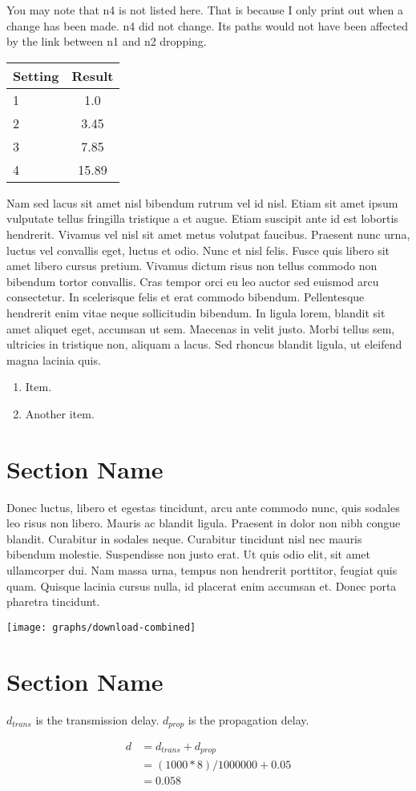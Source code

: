 \documentclass[fleqn,11pt]{article}
\begin{document}
You may note that n4 is not listed here. That is because I only print out when a change has been made. n4 did not change. Its paths would not have been affected by the link between n1 and n2 dropping.

\vspace{0.5cm}
\begin{tabular}{lc}
  \toprule
  Setting & Result\\
  \midrule
  1 & 1.0\\
  2 & 3.45\\
  3 & 7.85\\
  4 & 15.89\\
  \bottomrule
\end{tabular}
\vspace{0.5cm}

Nam sed lacus sit amet nisl bibendum rutrum vel id nisl. Etiam sit
amet ipsum vulputate tellus fringilla tristique a et augue. Etiam
suscipit ante id est lobortis hendrerit. Vivamus vel nisl sit amet
metus volutpat faucibus. Praesent nunc urna, luctus vel convallis
eget, luctus et odio. Nunc et nisl felis. Fusce quis libero sit amet
libero cursus pretium. Vivamus dictum risus non tellus commodo non
bibendum tortor convallis. Cras tempor orci eu leo auctor sed euismod
arcu consectetur. In scelerisque felis et erat commodo
bibendum. Pellentesque hendrerit enim vitae neque sollicitudin
bibendum. In ligula lorem, blandit sit amet aliquet eget, accumsan ut
sem. Maecenas in velit justo. Morbi tellus sem, ultricies in tristique
non, aliquam a lacus. Sed rhoncus blandit ligula, ut eleifend magna
lacinia quis.

\begin{enumerate}

\item Item.

\item Another item.

\end{enumerate}

\section{Section Name}

Donec luctus, libero et egestas tincidunt, arcu ante commodo nunc,
quis sodales leo risus non libero. Mauris ac blandit ligula. Praesent
in dolor non nibh congue blandit. Curabitur in sodales
neque. Curabitur tincidunt nisl nec mauris bibendum
molestie. Suspendisse non justo erat. Ut quis odio elit, sit amet
ullamcorper dui. Nam massa urna, tempus non hendrerit porttitor,
feugiat quis quam. Quisque lacinia cursus nulla, id placerat enim
accumsan et. Donec porta pharetra tincidunt.

\texttt{[image: graphs/download-combined]}

\section{Section Name}

$d_{trans}$ is the transmission delay. $d_{prop}$ is the propagation delay.

\begin{align*}
d &= d_{trans} + d_{prop}\\
  &= (1000*8)/1000000 + 0.05\\
  &= 0.058
\end{align*}
\end{document}
